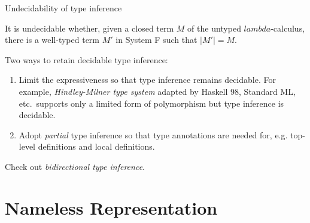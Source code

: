 \begin{frame}{Undecidability of type inference}
  \begin{theorem}[Wells, 1999]
     It is undecidable whether, given a closed term $M$ of the untyped
     $lambda$-calculus, there is a well-typed term $M'$ in System F such that
     $|M'| = M$.  
  \end{theorem}

  Two ways to retain decidable type inference:
  \begin{enumerate}
    \item Limit the expressiveness so that type inference remains decidable.
      For example, \emph{Hindley-Milner type system} adapted by Haskell 98, Standard ML, etc.\ supports only a limited form of polymorphism but type inference is decidable.
    \item Adopt \emph{partial} type inference so that type annotations are needed for, e.g. top-level definitions and 
      local definitions. 
  \end{enumerate}

  Check out \emph{bidirectional type inference}.
\end{frame}

\section{Nameless Representation}

